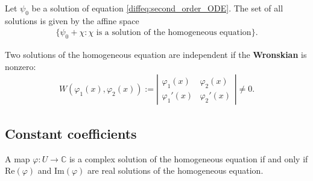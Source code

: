     \begin{property}
        Let $\psi_0$ be a solution of equation \ref{diffeq:second_order_ODE}. The set of all solutions is given by the affine space
        \begin{gather}
            \big\{\psi_0 + \chi:\chi\text{ is a solution of the homogeneous equation}\big\}.
        \end{gather}
    \end{property}
    \begin{property}
        Two solutions of the homogeneous equation are independent if the \textbf{Wronskian} is nonzero:
        \begin{gather}
            \label{diffeq:wronskian}
            W\left(\varphi_1(x), \varphi_2(x)\right) := \left|
            \begin{array}{cc}
                \varphi_1(x)&\varphi_2(x)\\
                \varphi_1'(x)&\varphi_2'(x)
            \end{array}
            \right|\neq 0.
        \end{gather}
    \end{property}


\subsection{Constant coefficients}

    \begin{property}
        A map $\varphi:U\rightarrow \mathbb{C}$ is a complex solution of the homogeneous equation if and only if $\text{Re}(\varphi)$ and $\text{Im}(\varphi)$ are real solutions of the homogeneous equation.
    \end{property}

